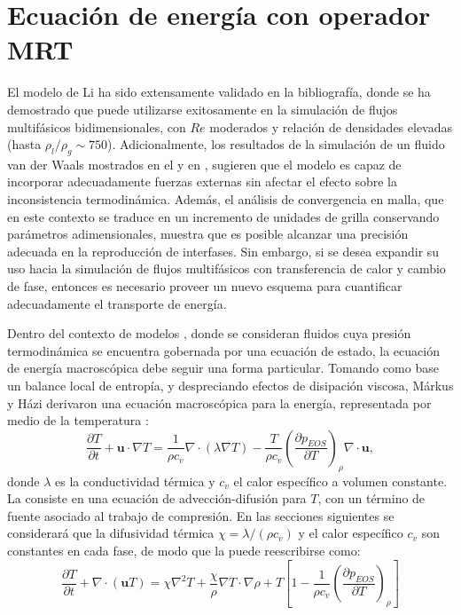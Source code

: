 \section{Ecuaci\'on de energ\'ia con operador MRT}
El modelo \pp{} de Li ha sido extensamente validado en la bibliograf\'ia, donde se ha demostrado que puede utilizarse exitosamente en la simulaci\'on de flujos multif\'asicos bidimensionales, con $Re$ moderados y relaci\'on de densidades elevadas (hasta $\rho_l / \rho_g \sim 750$). Adicionalmente, los resultados de la simulaci\'on de un fluido van der Waals mostrados en el  y en \cite{fogliatto_simulation_2019}, sugieren que el modelo es capaz de incorporar adecuadamente fuerzas externas sin afectar el efecto sobre la inconsistencia termodin\'amica. Adem\'as, el an\'alisis de convergencia en malla, que en este contexto se traduce en un incremento de unidades de grilla conservando par\'ametros adimensionales, muestra que es posible alcanzar una precisi\'on adecuada en la reproducci\'on de interfases. Sin embargo, si se desea expandir su uso hacia la simulaci\'on de flujos multif\'asicos con transferencia de calor y cambio de fase, entonces es necesario proveer un nuevo esquema para cuantificar adecuadamente el transporte de energ\'ia.

Dentro del contexto de modelos \pp{}, donde se consideran fluidos cuya presi\'on termodin\'amica se encuentra gobernada por una ecuaci\'on de estado, la ecuaci\'on de energ\'ia macrosc\'opica debe seguir una forma particular. Tomando como base un balance local de entrop\'ia, y despreciando efectos de disipaci\'on viscosa, M\'arkus y H\'azi derivaron una ecuaci\'on macrosc\'opica para la energ\'ia, representada por medio de la temperatura \cite{markus_simulation_2011}:
\begin{equation}
	\dfrac{\partial T}{\partial t} + \bm{u} \cdot \nabla T = \dfrac{1}{\rho c_v} \nabla \cdot(\lambda \nabla T) - \dfrac{T}{\rho c_v} \left( \dfrac{\partial p_{EOS}}{\partial T} \right)_{\rho} \nabla \cdot \bm{u},
	\label{eq:markus_orig}
\end{equation}
donde $\lambda$ es la conductividad t\'ermica y $c_v$ el calor espec\'ifico a volumen constante. La  consiste en una ecuaci\'on de advecci\'on-difusi\'on para $T$, con un t\'ermino de fuente asociado al trabajo de compresi\'on. En las secciones siguientes se considerar\'a que la difusividad t\'ermica $\chi = \lambda/(\rho c_v)$ y el calor espec\'ifico $c_v$ son constantes en cada fase, de modo que la  puede reescribirse como:
\begin{equation}
	\dfrac{\partial T}{\partial t} + \nabla \cdot (\bm{u} T) = \chi \nabla^2 T  + \dfrac{\chi}{\rho} \nabla T \cdot \nabla \rho + T \left[ 1 - \dfrac{1}{\rho c_v} \left( \dfrac{\partial p_{EOS}}{\partial T} \right)_{\rho} \right]
	\label{eq:markus}
\end{equation}

